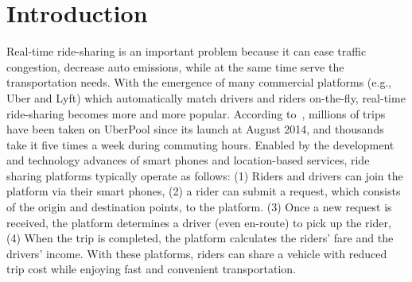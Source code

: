 \section{Introduction}

%	
%	
%	
%	
%	


Real-time ride-sharing is an important problem because it can ease traffic congestion, decrease auto emissions, while at the same time serve the transportation needs. With the emergence of many commercial platforms (e.g., Uber and Lyft) which automatically match drivers and riders on-the-fly, real-time ride-sharing becomes more and more popular. According to~\cite{uberpool}, millions of trips have been taken on UberPool since its launch at August 2014, and thousands take it five times a week during commuting hours. Enabled by the development and technology advances of smart phones and location-based services, ride sharing platforms typically operate as follows: (1) Riders and drivers can join the platform via their smart phones, (2) a rider can submit a request, which consists of the origin and destination points, to the platform. (3) Once a new request is received, the platform determines a driver (even en-route) to pick up the rider, (4) When the trip is completed, the platform calculates the riders' fare and the drivers' income. With these platforms, riders can share a vehicle with reduced trip cost while enjoying fast and convenient transportation.

